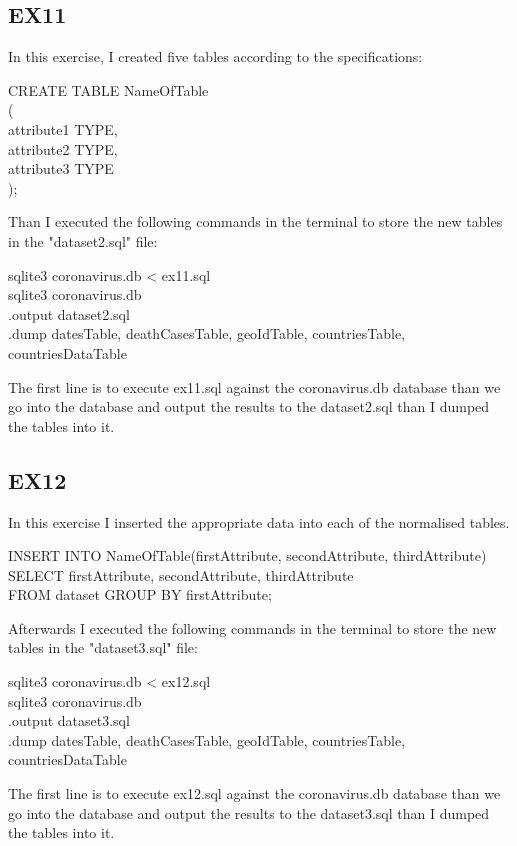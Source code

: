 \documentclass{article}
\begin{document}
\subsection{EX11}
In this exercise, I created five tables according to the specifications:
\begin{algorithm}
CREATE TABLE NameOfTable \\
( \\
    attribute1 TYPE, \\
    attribute2 TYPE, \\
    attribute3 TYPE  \\
);
\end{algorithm} \par
Than I executed the following commands in the terminal to store the new tables in the "dataset2.sql" file:
\begin{algorithm}
sqlite3 coronavirus.db < ex11.sql \\
sqlite3 coronavirus.db \\
.output dataset2.sql \\
.dump datesTable, deathCasesTable, geoIdTable, countriesTable, countriesDataTable
\end{algorithm} \par
The first line is to execute ex11.sql against the coronavirus.db database than we go into the database and output the results to the dataset2.sql than I dumped the tables into it.

\subsection{EX12}
In this exercise I inserted the appropriate data into each of the normalised tables.
\begin{algorithm}
INSERT INTO NameOfTable(firstAttribute, secondAttribute, thirdAttribute) \\
SELECT firstAttribute, secondAttribute, thirdAttribute \\
FROM dataset GROUP BY firstAttribute;
\end{algorithm} \par
Afterwards I executed the following commands in the terminal to store the new tables in the "dataset3.sql" file:
\begin{algorithm}
sqlite3 coronavirus.db < ex12.sql \\
sqlite3 coronavirus.db \\
.output dataset3.sql \\
.dump datesTable, deathCasesTable, geoIdTable, countriesTable, countriesDataTable
\end{algorithm} \par
The first line is to execute ex12.sql against the coronavirus.db database than we go into the database and output the results to the dataset3.sql than I dumped the tables into it.
\end{document}
